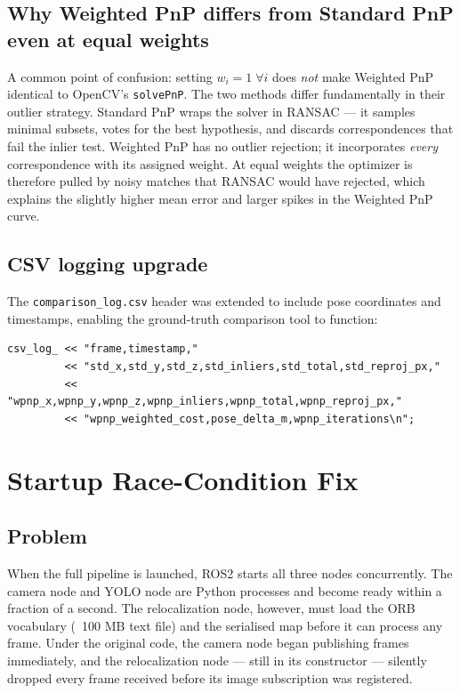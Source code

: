 \documentclass[11pt,a4paper]{article}
\begin{document}
\subsection{Why Weighted PnP differs from Standard PnP even at equal weights}

A common point of confusion: setting $w_i = 1\;\forall i$ does \emph{not}
make Weighted PnP identical to OpenCV's \texttt{solvePnP}. The two methods
differ fundamentally in their outlier strategy. Standard PnP wraps the solver
in RANSAC --- it samples minimal subsets, votes for the best hypothesis, and
discards correspondences that fail the inlier test. Weighted PnP has no outlier
rejection; it incorporates \emph{every} correspondence with its assigned weight.
At equal weights the optimizer is therefore pulled by noisy matches that RANSAC
would have rejected, which explains the slightly higher mean error and larger
spikes in the Weighted PnP curve.

\subsection{CSV logging upgrade}

The \texttt{comparison\_log.csv} header was extended to include pose coordinates
and timestamps, enabling the ground-truth comparison tool to function:

\begin{lstlisting}[style=cpp, caption={Updated CSV header in \texttt{relocalization\_node.cpp}}]
csv_log_ << "frame,timestamp,"
         << "std_x,std_y,std_z,std_inliers,std_total,std_reproj_px,"
         << "wpnp_x,wpnp_y,wpnp_z,wpnp_inliers,wpnp_total,wpnp_reproj_px,"
         << "wpnp_weighted_cost,pose_delta_m,wpnp_iterations\n";
\end{lstlisting}

\section{Startup Race-Condition Fix}

\subsection{Problem}

When the full pipeline is launched, ROS2 starts all three nodes concurrently.
The camera node and YOLO node are Python processes and become ready within a
fraction of a second. The relocalization node, however, must load the ORB
vocabulary (~100 MB text file) and the serialised map before it can process
any frame. Under the original code, the camera node began publishing frames
immediately, and the relocalization node --- still in its constructor ---
silently dropped every frame received before its image subscription was
registered.
\end{document}
